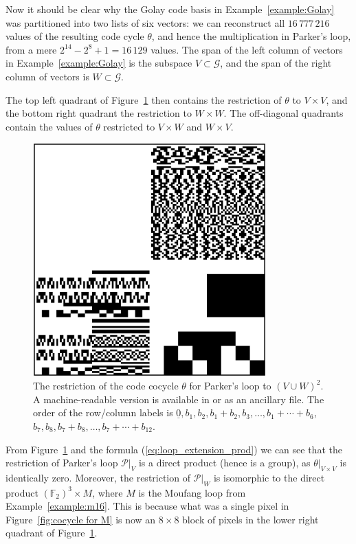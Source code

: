 \documentclass{article}
\theoremstyle{plain}
\theoremstyle{definition}
\def \cG {\mathcal{G}}
\def \cP {\mathcal{P}}
\def \FF {\mathbb{F}}
\begin{document}
Now it should be clear why the Golay code basis in Example~\ref{example:Golay} was partitioned into two lists of six vectors: we can reconstruct all $16\,777\,216$ values of the resulting code cycle $\theta$, and hence the multiplication in Parker's loop, from a mere $2^{14} - 2^8 + 1 = 16\,129$ values.
The span of the left column of vectors in Example~\ref{example:Golay} is the subspace $V\subset \cG$, and the span of the right column of vectors is $W\subset \cG$.

The top left quadrant of Figure~\ref{fig:Parker cocycle} then contains the restriction of $\theta$ to $V\times V$, and the bottom right quadrant the restriction to $W\times W$. 
The off-diagonal quadrants contain the values of $\theta$ restricted to $V\times W$ and $W\times V$.

\begin{figure}[ht]
\begin{center}
\includegraphics[width=0.8\textwidth]{alpha_awesum.png}
\end{center}
\caption{The restriction of the code cocycle $\theta$ for Parker's loop to $(V\cup W)^2$. A machine-readable version is available in \cite{RN_GH} or as an %
ancillary file. The order of the row/column labels is $\underline{0},b_1,b_2,b_1+b_2,b_3,\ldots, b_1+\cdots +b_6$, $b_7,b_8,b_7+b_8,\ldots,b_7+\cdots + b_{12}$.}
\label{fig:Parker cocycle}
\end{figure}

From Figure~\ref{fig:Parker cocycle} and the formula (\ref{eq:loop_extension_prod}) we can see that the restriction of Parker's loop $\cP\big|_V$ is a direct product (hence is a group), as $\theta\big|_{V\times V}$ is identically zero. 
Moreover, the restriction of $\cP\big|_W$ is isomorphic to the direct product $(\FF_2)^3 \times M$, where $M$ is the Moufang loop from Example~\ref{example:m16}.
This is because what was a single pixel in Figure~\ref{fig:cocycle for M} is now an $8\times 8$ block of pixels in the lower right quadrant of Figure~\ref{fig:Parker cocycle}.
\end{document}
